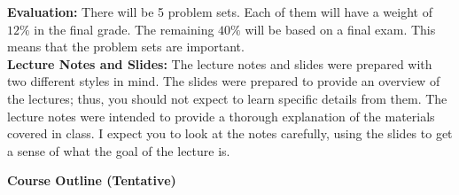 \documentclass[11pt]{article}
\begin{document}
\noindent \textbf{Evaluation:} There will be 5 problem sets. Each of them will have a weight of $12\%$ in the final grade. The remaining $40\%$ will be based on a final exam. This means that the problem sets are important. \\ 

\noindent \textbf{Lecture Notes and Slides:} The lecture notes and slides were prepared with two different styles in mind. The slides were prepared to provide an overview of the lectures; thus, you should not expect to learn specific details from them. The lecture notes were intended to provide a thorough explanation of the materials covered in class. I expect you to look at the notes carefully, using the slides to get a sense of what the goal of the lecture is. 

\newpage

\textbf{Course Outline (Tentative)}
\end{document}
